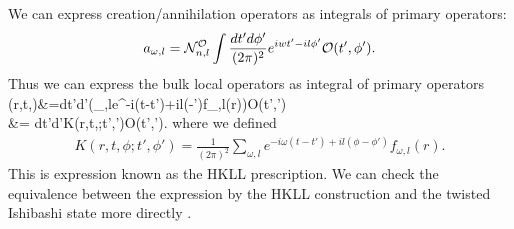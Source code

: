 \documentclass[11pt,a4paper]{article}
\def\w{{\omega}}
\def\a{{\alpha}}
\def\s{\sqrt}
\def\CO{{\cal O}}
\def\CN{{\cal N}}
\def\ba{\begin{eqnarray}}
\def\ea{\end{eqnarray}}
\def\bal#1\eal{\begin{align}#1\end{align}}
\def\f {\frac}
\def\no{\nonumber \\}
\def\la{\langle}
\def\lb{\rangle}
\def\q{\quad}
\def\z{\bar{z}}
\begin{document}
We can express creation/annihilation operators as integrals of primary operators:
\ba
a_{\w,l}=\CN^{\CO}_{n,l}\int\f{dt'd\phi'}{(2\pi)^{2}}e^{iwt'-il\phi'}\CO(t',\phi').
\ea
Thus we can express the bulk local operators as integral of primary operators
\bal
\phi(r,t,\phi)&=\int dt'd\phi'\biggl(\f{1}{(2\pi)^{2}}\sum_{\w,l}e^{-i\w(t-t')+il(\phi-\phi')}f_{\w,l}(r)\biggl)\CO(t',\phi')\no&=
\int dt'd\phi'K(r,t,\phi;t',\phi')\CO(t',\phi').
\eal
where we defined
\ba
K(r,t,\phi;t',\phi')=\f{1}{(2\pi)^{2}}\sum_{\w,l}e^{-i\w(t-t')+il(\phi-\phi')}f_{\w,l}(r).
\ea
This is expression known as the HKLL prescription. We can check the equivalence between the expression by the HKLL construction and the twisted Ishibashi state more directly \cite{GMT}.
\end{document}
